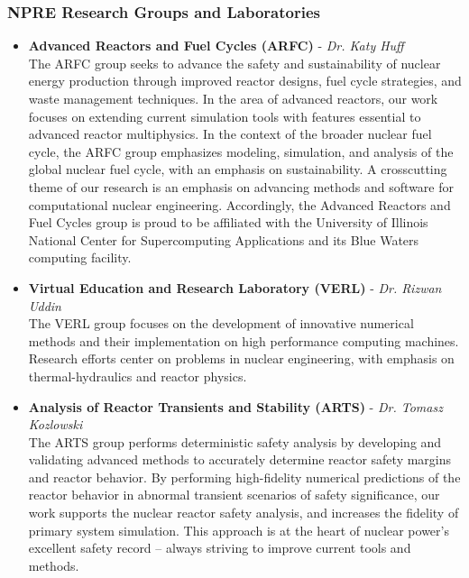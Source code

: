 \documentclass[12pt, letterpaper]{article}
\begin{document}
\subsubsection{NPRE Research Groups and Laboratories}
\begin{itemize}
  \item \textbf{Advanced Reactors and Fuel Cycles (ARFC)} - \textit{Dr. Katy Huff}\\
  The ARFC group seeks to advance the safety and sustainability of nuclear energy production through improved reactor designs, fuel cycle strategies, and waste management techniques. In the area of advanced reactors, our work focuses on extending current simulation tools with features essential to advanced reactor multiphysics. In the context of the broader nuclear fuel cycle, the ARFC group emphasizes modeling, simulation, and analysis of the global nuclear fuel cycle, with an emphasis on sustainability. A crosscutting theme of our research is an emphasis on advancing methods and software for computational nuclear engineering. Accordingly, the Advanced Reactors and Fuel Cycles group is proud to be affiliated with the University of Illinois National Center for Supercomputing Applications and its Blue Waters computing facility.
  \item \textbf{Virtual Education and Research Laboratory (VERL)} - \textit{Dr. Rizwan Uddin}\\
  The VERL group focuses on the development of innovative numerical methods and their implementation on high performance computing machines. Research efforts center on problems in nuclear engineering, with emphasis on thermal-hydraulics and reactor physics.

  \item \textbf{Analysis of Reactor Transients and Stability (ARTS)} - \textit{Dr. Tomasz Kozlowski}\\
  The ARTS group performs deterministic safety analysis by developing and validating advanced methods to accurately determine reactor safety margins and reactor behavior. By performing high-fidelity numerical predictions of the reactor behavior in abnormal transient scenarios of safety significance, our work supports the nuclear reactor safety analysis, and increases the fidelity of primary system simulation. This approach is at the heart of nuclear power’s excellent safety record – always striving to improve current tools and methods.


\end{itemize}
\end{document}
